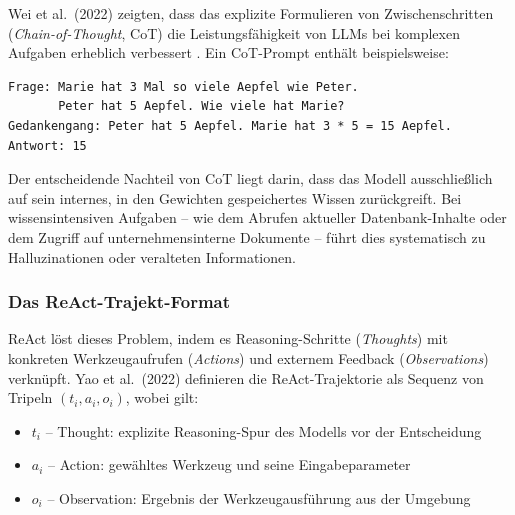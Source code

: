 \documentclass[12pt,a4paper,oneside]{report}
\begin{document}
Wei et al.\ (2022) zeigten, dass das explizite Formulieren von Zwischenschritten
(\textit{Chain-of-Thought}, \ac{CoT}) die Leistungsfähigkeit von \ac{LLM}s bei
komplexen Aufgaben erheblich verbessert \cite{wei2022chain}. Ein \ac{CoT}-Prompt
enthält beispielsweise:

\begin{lstlisting}[caption={Beispiel eines Chain-of-Thought-Prompts}, label=lst:cot]
Frage: Marie hat 3 Mal so viele Aepfel wie Peter.
       Peter hat 5 Aepfel. Wie viele hat Marie?
Gedankengang: Peter hat 5 Aepfel. Marie hat 3 * 5 = 15 Aepfel.
Antwort: 15
\end{lstlisting}

Der entscheidende Nachteil von \ac{CoT} liegt darin, dass das Modell ausschließlich
auf sein internes, in den Gewichten gespeichertes Wissen zurückgreift. Bei
wissensintensiven Aufgaben -- wie dem Abrufen aktueller Datenbank-Inhalte oder dem
Zugriff auf unternehmensinterne Dokumente -- führt dies systematisch zu Halluzinationen
oder veralteten Informationen.

\subsubsection{Das ReAct-Trajekt-Format}

ReAct löst dieses Problem, indem es Reasoning-Schritte (\textit{Thoughts}) mit
konkreten Werkzeugaufrufen (\textit{Actions}) und externem Feedback (\textit{Observations})
verknüpft. Yao et al.\ (2022) definieren die ReAct-Trajektorie als Sequenz von Tripeln
$(t_i, a_i, o_i)$, wobei gilt:

\begin{itemize}
  \item $t_i$ -- Thought: explizite Reasoning-Spur des Modells vor der Entscheidung
  \item $a_i$ -- Action: gewähltes Werkzeug und seine Eingabeparameter
  \item $o_i$ -- Observation: Ergebnis der Werkzeugausführung aus der Umgebung
\end{itemize}
\end{document}
